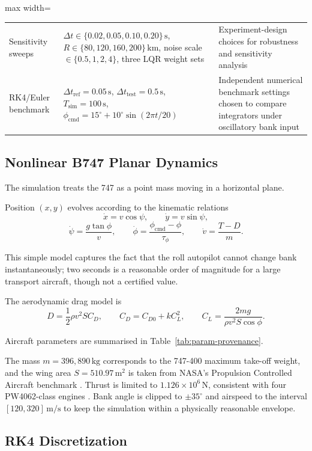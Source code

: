 \documentclass{Academic}
\begin{document}
\begin{table}[!htb]
\begin{adjustbox}{max width=\textwidth}
\begin{tabular}{@{}>{\raggedright\arraybackslash}p{} >{\raggedright\arraybackslash}p{} >{\raggedright\arraybackslash}p{}@{}}
Sensitivity sweeps & \(\Delta t\in\{0.02,0.05,0.10,0.20\}\,\mathrm{s}\), \(R\in\{80,120,160,200\}\,\mathrm{km}\), noise scale \(\in\{0.5,1,2,4\}\), three LQR weight sets & Experiment-design choices for robustness and sensitivity analysis \\
RK4/Euler benchmark & \(\Delta t_{\mathrm{ref}}=0.05\,\mathrm{s}\), \(\Delta t_{\mathrm{test}}=0.5\,\mathrm{s}\), \(T_{\mathrm{sim}}=100\,\mathrm{s}\), \(\phi_{\mathrm{cmd}}=15^\circ+10^\circ\sin(2\pi t/20)\) & Independent numerical benchmark settings chosen to compare integrators under oscillatory bank input \\
\bottomrule
\end{tabular}
\end{adjustbox}
\end{table}

\subsection{Nonlinear B747 Planar Dynamics}

The simulation treats the 747 as a point mass moving in a horizontal plane. 

Position \((x,y)\) evolves according to the kinematic relations
\[
\dot x = v\cos\psi,\qquad
\dot y = v\sin\psi,
\]
\[
\dot\psi = \frac{g\tan\phi}{v},\qquad
\dot\phi = \frac{\phi_{\mathrm{cmd}}-\phi}{\tau_\phi},\qquad
\dot v = \frac{T-D}{m}.
\]

This simple model captures the fact that the roll autopilot cannot change bank instantaneously; two seconds is a reasonable order of magnitude for a large transport aircraft, though not a certified value.

The aerodynamic drag model is
\[
D=\frac12 \rho v^2 S C_D,\qquad
C_D=C_{D0}+k C_L^2,\qquad
C_L=\frac{2mg}{\rho v^2 S \cos\phi}.
\]

Aircraft parameters are summarised in Table~\ref{tab:param-provenance}. 

The mass \(m=396{,}890\,\mathrm{kg}\) corresponds to the 747-400 maximum take-off weight, and the wing area \(S=510.97\,\mathrm{m}^{2}\) is taken from NASA's Propulsion Controlled Aircraft benchmark \supercite{burken1997}. Thrust is limited to \(1.126\times10^{6}\,\mathrm{N}\), consistent with four PW4062-class engines \supercite{pw400094guide}. Bank angle is clipped to \(\pm35^{\circ}\) and airspeed to the interval \([120,320]\,\mathrm{m/s}\) to keep the simulation within a physically reasonable envelope.

\subsection{RK4 Discretization}
\end{document}
